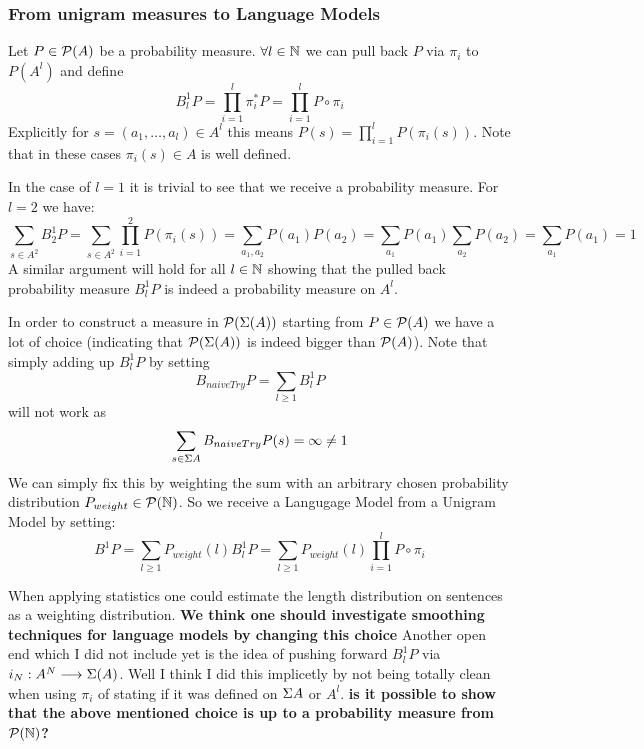 \documentclass[11pt]{article}
\begin{document}

\subsubsection{From unigram measures to Language Models}
Let $P \in \mathcal{P}(A)$ be a probability measure. 
$\forall l \in {\mathbb N}$ we can pull back $P$ via $\pi_i$ to $P(A^l)$ and define
\[B_l^1P = \prod_{i=1}^l \pi_i^* P = \prod_{i=1}^l P \circ \pi_i \]
Explicitly for $s = (a_1,\dots,a_l) \in A^l$ this means $P(s)=\prod_{i=1}^l P(\pi_i(s))$.
Note that in these cases $\pi_i(s) \in A$ is well defined.

In the case of $l=1$ it is trivial to see that we receive a probability measure.
For $l=2$ we have:
\[\sum_{s\in A^2}B^1_2P = \sum_{s\in A^2} \prod_{i=1}^2 P(\pi_i(s)) = \sum_{a_1,a_2} P(a_1)P(a_2) = \sum_{a_1} P(a_1) \sum_{a_2} P(a_2) = \sum_{a_1} P(a_1) = 1\]
A similar argument will hold for all $l \in {\mathbb N}$ showing that the pulled back probability measure $B_l^1P$ is indeed a probability measure on $A^l$. 

In order to construct a measure in $\mathcal{P}(\Sigma(A))$ starting from $P\in \mathcal{P}(A)$ we have a lot of choice (indicating that $\mathcal{P}(\Sigma(A))$ is indeed bigger than $\mathcal{P}(A)$).
Note that simply adding up $B_l^1P$ by setting 
\[B_{naiveTry}P = \sum_{l\geq 1}B^1_lP\] 
will not work as 
\[\sum_{s\in \Sigma A}B_{naiveTry}P(s) = \infty \neq 1\]
We can simply fix this by weighting the sum with an arbitrary chosen probability distribution $P_{weight}\in \mathcal{P}({\mathbb N})$.
So we receive a Langugage Model from a Unigram Model by setting:
\[B^1P = \sum_{l\geq 1}  P_{weight}(l)B^1_lP = \sum_{l\geq 1} P_{weight}(l)\prod_{i=1}^l P \circ \pi_i \]

When applying statistics one could estimate the length distribution on sentences as a weighting distribution.
\textbf{We think one should investigate smoothing techniques for language models by changing this choice}
Another open end which I did not include yet is the idea of pushing forward $B^1_lP$ via $i_N:A^N \longrightarrow \Sigma(A)$. Well I think I did this implicetly by not being totally clean when using $\pi_i$ of stating if it was defined on $\Sigma A$ or $A^l$.
\textbf{is it possible to show that the above mentioned choice is up to a probability measure from $\mathcal{P}({\mathbb N})$?}

\end{document}
